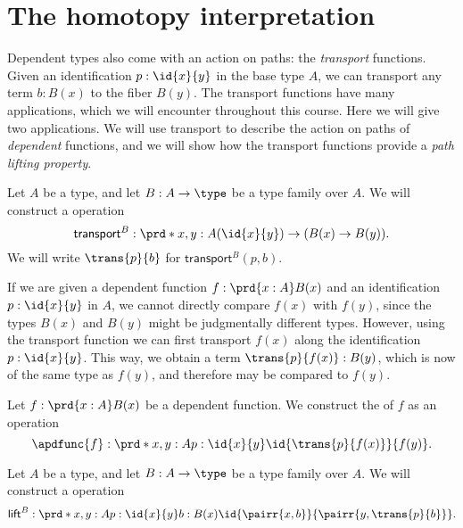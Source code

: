 \section{The homotopy interpretation}

Dependent types also come with an action on paths: the \emph{transport} functions.
Given an identification $p:\id{x}{y}$ in the base type $A$, we can transport any term $b:B(x)$ to the fiber $B(y)$.
The transport functions have many applications, which we will encounter throughout this course.
Here we will give two applications.
We will use transport to describe the action on paths of \emph{dependent} functions, and we will show how the transport functions provide a \emph{path lifting property}. 

\begin{defn}
Let $A$ be a type, and let $B:A\to\type$ be a type family over $A$.
We will construct a  operation
\begin{equation*}
\mathsf{transport}^B:\prd*{x,y:A} (\id{x}{y})\to (B(x)\to B(y)).
\end{equation*}
We will write $\trans{p}{b}$ for $\mathsf{transport}^B(p,b)$.
\end{defn}

If we are given a dependent function $f:\prd{x:A}B(x)$ and an identification $p:\id{x}{y}$ in $A$, we cannot directly compare $f(x)$ with $f(y)$, since the types $B(x)$ and $B(y)$ might be judgmentally different types. However, using the transport function we can first transport $f(x)$ along the identification $p:\id{x}{y}$. This way, we obtain a term $\trans{p}{f(x)}:B(y)$, which is now of the same type as $f(y)$, and therefore may be compared to $f(y)$.

\begin{defn}\label{defn:apd}
Let $f:\prd{x:A}B(x)$ be a dependent function. We construct the  of $f$ as an operation
\begin{equation*}
\apdfunc{f}:\prd*{x,y:A}{p:\id{x}{y}} \id{\trans{p}{f(x)}}{f(y)}.
\end{equation*}
\end{defn}

\begin{defn}\label{defn:path_lifting}
Let $A$ be a type, and let $B:A\to\type$ be a type family over $A$.
We will construct a  operation
\begin{equation*}
\mathsf{lift}^B : \prd*{x,y:A}{p:\id{x}{y}}{b:B(x)} \id{\pairr{x,b}}{\pairr{y,\trans{p}{b}}}.
\end{equation*}
\end{defn}

